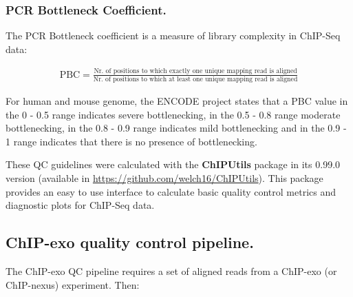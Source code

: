 \documentclass{bmcart}
\begin{document}
\subsubsection*{PCR Bottleneck Coefficient.}

The PCR Bottleneck coefficient is a measure of library complexity in
ChIP-Seq data:

\begin{align}
  \mbox{PBC} = \frac{\text{Nr. of positions to which exactly one
      unique mapping read is aligned}}{\text{Nr. of positions to
      which at least one unique mapping read is aligned}} \nonumber
\end{align}

For human and mouse genome, the ENCODE project states that a PBC value
in the 0 - 0.5 range indicates severe bottlenecking, in the 0.5 - 0.8
range moderate bottlenecking, in the 0.8 - 0.9 range indicates mild
bottlenecking and in the 0.9 - 1 range indicates that there is no
presence of bottlenecking.

These QC guidelines were calculated with the \textbf{ChIPUtils}
package in its 0.99.0 version (available in
\url{https://github.com/welch16/ChIPUtils}). This package provides an
easy to use interface to calculate basic quality control metrics and
diagnostic plots for ChIP-Seq data.

\subsection*{ChIP-exo quality control pipeline.}

The ChIP-exo QC pipeline requires a set of aligned reads from a
ChIP-exo (or ChIP-nexus) experiment. Then:
\end{document}
